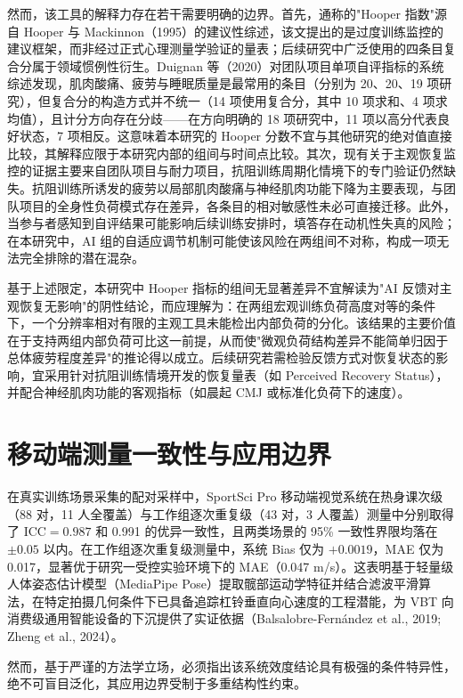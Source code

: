 \documentclass[UTF8,zihao=-4,twoside,openany]{ctexbook}
\begin{document}
然而，该工具的解释力存在若干需要明确的边界。首先，通称的"Hooper 指数"源自 Hooper 与 Mackinnon（1995）的建议性综述，该文提出的是过度训练监控的建议框架，而非经过正式心理测量学验证的量表；后续研究中广泛使用的四条目复合分属于领域惯例性衍生。Duignan 等（2020）对团队项目单项自评指标的系统综述发现，肌肉酸痛、疲劳与睡眠质量是最常用的条目（分别为 20、20、19 项研究），但复合分的构造方式并不统一（14 项使用复合分，其中 10 项求和、4 项求均值），且计分方向存在分歧——在方向明确的 18 项研究中，11 项以高分代表良好状态，7 项相反。这意味着本研究的 Hooper 分数不宜与其他研究的绝对值直接比较，其解释应限于本研究内部的组间与时间点比较。其次，现有关于主观恢复监控的证据主要来自团队项目与耐力项目，抗阻训练周期化情境下的专门验证仍然缺失。抗阻训练所诱发的疲劳以局部肌肉酸痛与神经肌肉功能下降为主要表现，与团队项目的全身性负荷模式存在差异，各条目的相对敏感性未必可直接迁移。此外，当参与者感知到自评结果可能影响后续训练安排时，填答存在动机性失真的风险；在本研究中，AI 组的自适应调节机制可能使该风险在两组间不对称，构成一项无法完全排除的潜在混杂。

基于上述限定，本研究中 Hooper 指标的组间无显著差异不宜解读为"AI 反馈对主观恢复无影响"的阴性结论，而应理解为：在两组宏观训练负荷高度对等的条件下，一个分辨率相对有限的主观工具未能检出内部负荷的分化。该结果的主要价值在于支持两组内部负荷可比这一前提，从而使"微观负荷结构差异不能简单归因于总体疲劳程度差异"的推论得以成立。后续研究若需检验反馈方式对恢复状态的影响，宜采用针对抗阻训练情境开发的恢复量表（如 Perceived Recovery Status），并配合神经肌肉功能的客观指标（如晨起 CMJ 或标准化负荷下的速度）。

\section{移动端测量一致性与应用边界}
在真实训练场景采集的配对采样中，SportSci Pro 移动端视觉系统在热身课次级（88 对，11 人全覆盖）与工作组逐次重复级（43 对，3 人覆盖）测量中分别取得了 $\text{ICC}=0.987$ 和 0.991 的优异一致性，且两类场景的 95\% 一致性界限均落在 $\pm 0.05$ 以内。在工作组逐次重复级测量中，系统 Bias 仅为 $+0.0019$，MAE 仅为 0.017，显著优于研究一受控实验环境下的 MAE（0.047 m/s）。这表明基于轻量级人体姿态估计模型（MediaPipe Pose）提取髋部运动学特征并结合滤波平滑算法，在特定拍摄几何条件下已具备追踪杠铃垂直向心速度的工程潜能，为 VBT 向消费级通用智能设备的下沉提供了实证依据（Balsalobre-Fernández et al., 2019; Zheng et al., 2024）。

然而，基于严谨的方法学立场，必须指出该系统效度结论具有极强的条件特异性，绝不可盲目泛化，其应用边界受制于多重结构性约束。
\end{document}
